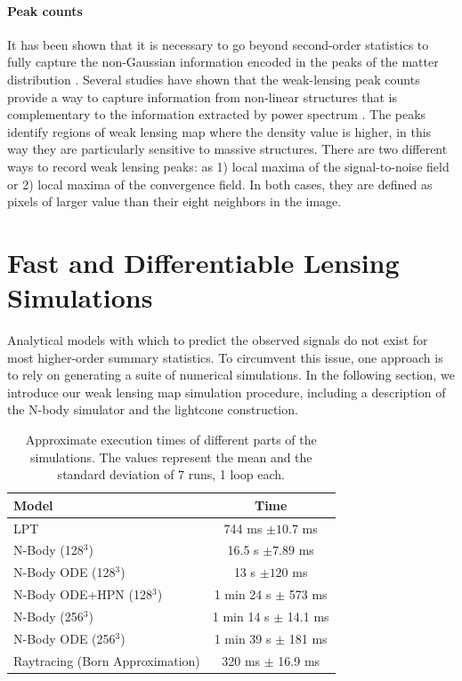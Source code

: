 \documentclass{aa}
\begin{document}
\paragraph{Peak counts}It has been shown that it is necessary to go beyond second-order statistics to fully capture the non-Gaussian information encoded in the peaks of the matter distribution 
\citep{1997A&A...322....1B, 1997ApJ...484..560J,1999A&A...342...15V,2003A&A...397..809S}. Several studies have shown that the weak-lensing peak counts provide a way to capture information from non-linear structures that is complementary to the information extracted by power spectrum \citep{lin2015new, peel2017cosmological, ajani2020constraining, harnois2021cosmic, zurcher2022dark}.
The peaks identify regions of weak lensing map where the density value is higher, in this way they are particularly sensitive to massive structures.
There are two different ways to record weak lensing peaks: as 1) local maxima of the signal-to-noise field or 2) local maxima of the convergence field. In both cases, they are defined as pixels of larger value than their eight neighbors in the image.


\section{Fast and Differentiable Lensing Simulations}\label{Fast_and_Differentiable_Lensing_Simulations}
Analytical models with which to predict the observed signals do not exist for most higher-order summary statistics. 
To circumvent this issue, one approach is to rely on generating a suite of numerical simulations.
In the following section, we introduce our weak lensing map simulation procedure, including a description of the N-body simulator and the lightcone construction.

\begin{table}
	\centering
	\caption{Approximate execution times of different parts of the simulations. The values represent the mean and the standard deviation of 7 runs, 1 loop each.}
	\begin{tabular}{lc} 
		\hline 
		Model  & Time  \\
             \hline
		LPT & 744 ms  $\pm 10.7$ ms  \\ 
		N-Body (128$^3$) & 16.5 s $\pm 7.89$ ms   \\ 
		N-Body ODE (128$^3$) & 13 s $\pm 120$ ms    \\ 
    N-Body ODE+HPN (128$^3$) & 1 min 24 s $\pm$ 573 ms    \\ 
		N-Body (256$^3$) & 1 min 14 s $\pm$ 14.1 ms  \\
		N-Body ODE (256$^3$) & 1 min 39 s $\pm$ 181 ms   \\
		Raytracing (Born Approximation) & 320 ms $\pm$ 16.9 ms    \\
		\hline
	\end{tabular}
	\label{tab:computational_cost}
\end{table}
\end{document}
